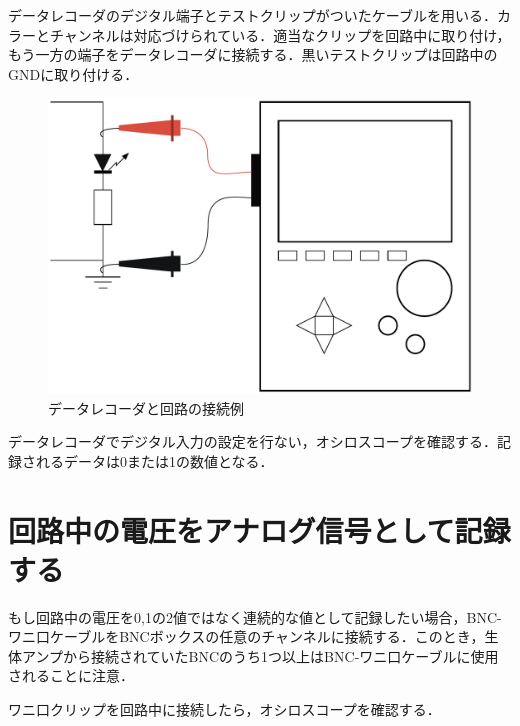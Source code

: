\documentclass[a4j, twocolumn, openleft, uplatex, dvipdfmx]{jsbook}
\begin{document}
        データレコーダのデジタル端子とテストクリップがついたケーブルを用いる．カラーとチャンネルは対応づけられている．適当なクリップを回路中に取り付け，もう一方の端子をデータレコーダに接続する．黒いテストクリップは回路中のGNDに取り付ける．

        \begin{figure}[H]
            \centering
            \includegraphics[width=\linewidth]{./figure/digital-testclip.pdf}
            \caption{データレコーダと回路の接続例}
        \end{figure}

        データレコーダでデジタル入力の設定を行ない，オシロスコープを確認する．記録されるデータは0または1の数値となる．

        \section{回路中の電圧をアナログ信号として記録する}
        \label{sec:回路中の電圧をアナログ信号として記録する}

        もし回路中の電圧を0,1の2値ではなく連続的な値として記録したい場合，BNC-ワニ口ケーブルをBNCボックスの任意のチャンネルに接続する．このとき，生体アンプから接続されていたBNCのうち1つ以上はBNC-ワニ口ケーブルに使用されることに注意．

        ワニ口クリップを回路中に接続したら，オシロスコープを確認する．
\end{document}
